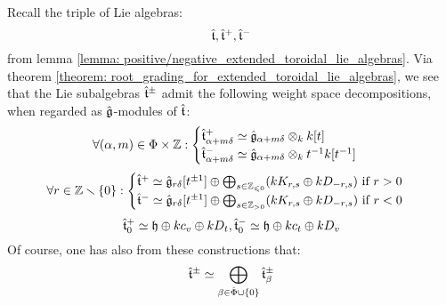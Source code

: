         \begin{corollary}
            Recall the triple of Lie algebras:
                $$\hat{\mathfrak{t}}, \hat{\mathfrak{t}}^+, \hat{\mathfrak{t}}^-$$
            from lemma \ref{lemma: positive/negative_extended_toroidal_lie_algebras}. Via theorem \ref{theorem: root_grading_for_extended_toroidal_lie_algebras}, we see that the Lie subalgebras $\hat{\mathfrak{t}}^{\pm}$ admit the following weight space decompositions, when regarded as $\hat{\mathfrak{g}}$-modules of $\hat{\mathfrak{t}}$:
                $$
                    \forall (\alpha, m) \in \Phi \x \Z:
                    \begin{cases}
                        \extendedtoroidal^+_{\alpha + m\delta} \cong \hat{\g}_{\alpha + m\delta} \tensor_{k} k[t]
                        \\
                        \extendedtoroidal^-_{\alpha + m\delta} \cong \hat{\g}_{\alpha + m\delta} \tensor_{k} t^{-1}k[t^{-1}]
                    \end{cases}
                $$
                $$
                    \forall r \in \mathbb{Z} \smallsetminus \{0\}:
                    \begin{cases}
                        \text{$\hat{\mathfrak{t}}^+ \simeq \hat{\mathfrak{g}}_{r\delta}[t^{\pm 1}] \oplus \bigoplus_{s \in \mathbb{Z}_{\leqslant 0}} (k K_{r, s} \oplus k D_{-r, s})$ if $r > 0$}
                        \\
                        \text{$\hat{\mathfrak{t}}^- \simeq \hat{\mathfrak{g}}_{r\delta}[t^{\pm 1}] \oplus \bigoplus_{s \in \mathbb{Z}_{> 0}} (k K_{r, s} \oplus k D_{-r, s})$ if $r < 0$}
                    \end{cases}
                $$
                $$\hat{\mathfrak{t}}^+_0 \simeq \mathfrak{h} \oplus k c_v \oplus k D_t, \hat{\mathfrak{t}}^-_0 \simeq \mathfrak{h} \oplus k c_t \oplus k D_v$$
            Of course, one has also from these constructions that:
                $$\hat{\mathfrak{t}}^{\pm} \simeq \bigoplus_{\beta \in \hat{\Phi} \cup \{0\}} \hat{\mathfrak{t}}^{\pm}_{\beta}$$
        \end{corollary}
        
